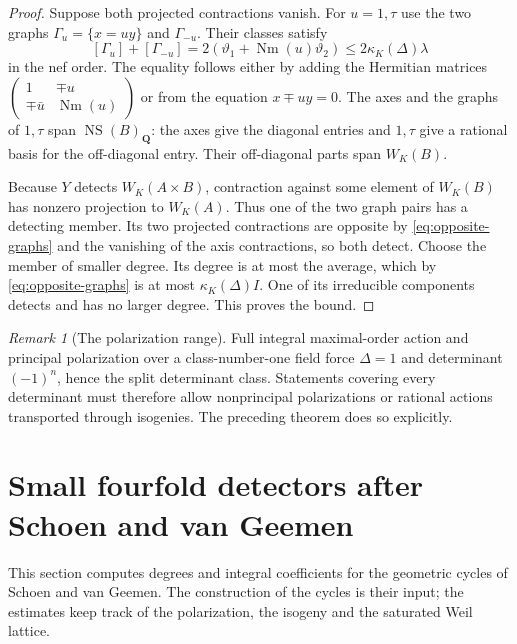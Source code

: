\documentclass[11pt]{article}
\theoremstyle{definition}
\theoremstyle{remark}
\newtheorem{remark}[theorem]{Remark}
\newcommand{\Q}{\mathbf Q}
\newcommand{\Nm}{\operatorname{Nm}}
\begin{document}
\begin{proof}
Suppose both projected contractions vanish. For $u=1,\tau$ use the two graphs $\Gamma_u=\{x=u y\}$ and $\Gamma_{-u}$. Their classes satisfy
\begin{equation}\label{eq:opposite-graphs}
 [\Gamma_u]+[\Gamma_{-u}]
 =2(\vartheta_1+\Nm(u)\vartheta_2)
 \le2\kappa_K(\Delta)\lambda
\end{equation}
in the nef order. The equality follows either by adding the Hermitian matrices
$\left(\begin{smallmatrix}1&\mp u\\\mp\bar u&\Nm(u)\end{smallmatrix}\right)$ or from the equation $x\mp uy=0$. The axes and the graphs of $1,\tau$ span $\operatorname{NS}(B)_\Q$: the axes give the diagonal entries and $1,\tau$ give a rational basis for the off-diagonal entry. Their off-diagonal parts span $W_K(B)$.

Because $Y$ detects $W_K(A\times B)$, contraction against some element of $W_K(B)$ has nonzero projection to $W_K(A)$. Thus one of the two graph pairs has a detecting member. Its two projected contractions are opposite by \eqref{eq:opposite-graphs} and the vanishing of the axis contractions, so both detect. Choose the member of smaller degree. Its degree is at most the average, which by \eqref{eq:opposite-graphs} is at most $\kappa_K(\Delta)I$. One of its irreducible components detects and has no larger degree. This proves the bound.
\end{proof}

\begin{remark}[The polarization range]\label{rem:polarization-range}
Full integral maximal-order action and principal polarization over a class-number-one field force $\Delta=1$ and determinant $(-1)^n$, hence the split determinant class. Statements covering every determinant must therefore allow nonprincipal polarizations or rational actions transported through isogenies. The preceding theorem does so explicitly.
\end{remark}
\section{Small fourfold detectors after Schoen and van Geemen}
\label{sec:small}
This section computes degrees and integral coefficients for the geometric cycles of Schoen and van Geemen. The construction of the cycles is their input; the estimates keep track of the polarization, the isogeny and the saturated Weil lattice.
\end{document}
